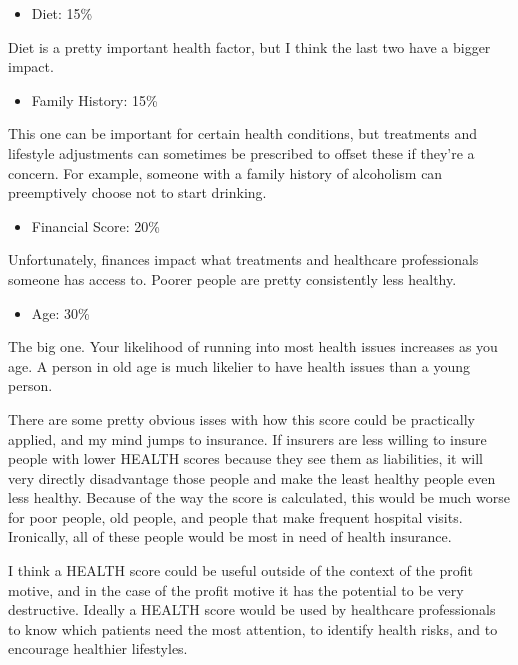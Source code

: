 \documentclass[12pt]{article}
\begin{document}
\begin{itemize}
    \item{Diet: 15\%}
\end{itemize}

Diet is a pretty important health factor, but I think the last two have a bigger impact.

\begin{itemize}
    \item{Family History: 15\%}
\end{itemize}

This one can be important for certain health conditions, but treatments and lifestyle adjustments can sometimes
be prescribed to offset these if they're a concern. For example, someone with a family history of alcoholism can
preemptively choose not to start drinking.

\begin{itemize}
    \item{Financial Score: 20\%}
\end{itemize}

Unfortunately, finances impact what treatments and healthcare professionals someone has access to. Poorer people
are pretty consistently less healthy.

\begin{itemize}
    \item{Age: 30\%}
\end{itemize}

The big one. Your likelihood of running into most health issues increases as you age. A person in old age is much likelier to
have health issues than a young person.

There are some pretty obvious isses with how this score could be practically applied, and my mind jumps to insurance. 
If insurers are less willing to insure people with lower HEALTH scores because they see them as liabilities, it will
very directly disadvantage those people and make the least healthy people even less healthy. Because of the way the score
is calculated, this would be much worse for poor people, old people, and people that make frequent hospital visits. 
Ironically, all of these people would be most in need of health insurance. 

I think a HEALTH score could be useful outside of the context of the profit motive, and in the case of the profit motive 
it has the potential to be very destructive. Ideally a HEALTH score would be used by healthcare professionals to know which
patients need the most attention, to identify health risks, and to encourage healthier lifestyles.
\end{document}
